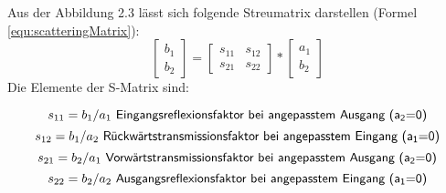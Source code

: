 Aus der Abbildung 2.3 lässt sich folgende Streumatrix darstellen (Formel \ref{equ:scatteringMatrix}):
\begin{equation}\label{equ:scatteringMatrix}
	\left[
		\begin{matrix}b_1 \\ b_2 \end{matrix}
	\right]
 	=
 	\left[
 		\begin{matrix}
			s_{11}&s_{12} \\s_{21}&s_{22}
		\end{matrix}
	\right]
	* 
	\left[
		\begin{matrix}
			a_1\\b_2
		\end{matrix}
	\right]
\end{equation}
Die Elemente der S-Matrix sind:

\begin{equation}\label{equ:def_s11}
	s_{11} = b_1/a_1\textsf{ Eingangsreflexionsfaktor bei angepasstem Ausgang (a\textsubscript{2}=0)}
\end{equation}
\begin{equation}\label{equ:def_s12}
	s_{12} = b_1/a_2\textsf{ Rückwärtstransmissionsfaktor bei angepasstem Eingang (a\textsubscript{1}=0)}
\end{equation}
\begin{equation}\label{equ:def_s21}
	s_{21} = b_2/a_1\textsf{ Vorwärtstransmissionsfaktor bei angepasstem Ausgang (a\textsubscript{2}=0)}
\end{equation}
\begin{equation}\label{equ:def_s22}
	s_{22} = b_2/a_2\textsf{ Ausgangsreflexionsfaktor bei angepasstem Eingang (a\textsubscript{1}=0)}
\end{equation}
\newpage